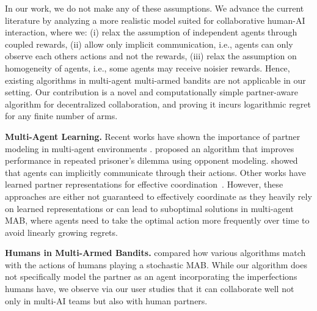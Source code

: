\documentclass[letterpaper]{article} %
\theoremstyle{definition}
\begin{document}
In our work, we do not make any of these assumptions. We advance the current literature by analyzing a more realistic model suited for collaborative human-AI interaction, where we: (i) relax the assumption of independent agents through coupled rewards, (ii) allow only implicit communication, i.e., agents can only observe each others actions and not the rewards, (iii) relax the assumption on homogeneity of agents, i.e., some agents may receive noisier rewards. Hence, existing algorithms in multi-agent multi-armed bandits are not applicable in our setting. Our contribution is a novel and computationally simple partner-aware algorithm for decentralized collaboration, and proving it incurs logarithmic regret for any finite number of arms.


\smallskip
\noindent\textbf{Multi-Agent Learning.} 
Recent works have shown the importance of partner modeling in multi-agent environments \cite{devin2016implemented,zhu2020multi}. \citet{foerster2018learning} proposed an algorithm that 
improves performance in repeated prisoner's dilemma using opponent modeling. 
\citet{losey2020learning} showed that agents can implicitly communicate through their actions. Other works have learned partner representations for effective coordination~\cite{shih2021critical,xie2020learning,grover2018learning}.
However, these approaches are either not guaranteed to effectively coordinate as they heavily rely on learned representations or can lead to suboptimal solutions in multi-agent MAB, where agents need to take the optimal action more frequently over time to avoid linearly growing regrets.
 

\smallskip
\noindent\textbf{Humans in Multi-Armed Bandits.} 
\citet{zhang2013cheap} compared how various algorithms match with the actions of humans playing a stochastic MAB.
While our algorithm does not specifically model the partner as an agent incorporating the imperfections humans have, we observe via our user studies that it can collaborate well not only in multi-AI teams but also with human partners.
\end{document}
